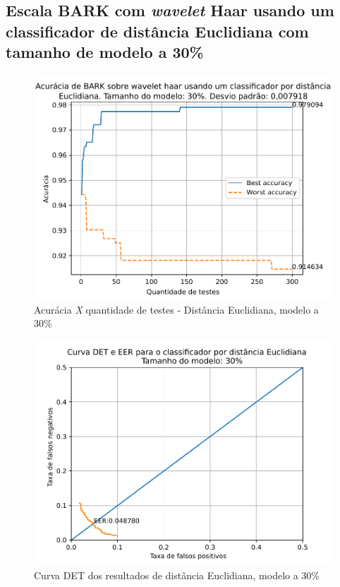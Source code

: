 			\FloatBarrier
		\subsection{Escala BARK com \textit{wavelet} Haar usando um classificador de distância Euclidiana com tamanho de modelo a 30\%}
		
			
		
			\begin{figure}[ht]
				\centering
				\includegraphics[width=\linewidth]{images/results/confusionMatrices/classifier_Euclidian_30}
				\caption{Acurácia \textit{X} quantidade de testes - Distância Euclidiana, modelo a 30\%}
				\label{fig:classifiereuclidian30}
			\end{figure}
		
			\begin{figure}[ht]
				\centering
				\includegraphics[width=.9\linewidth]{images/results/det/DET_for_classifier_Euclidian_30}
				\caption{Curva DET dos resultados de distância Euclidiana, modelo a 30\%}
				\label{fig:detforclassifiereuclidian30}
			\end{figure}


